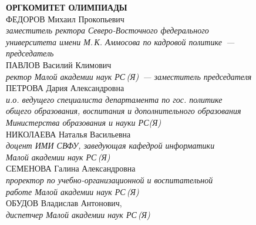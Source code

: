 \newpage
\noindent
\textbf{ОРГКОМИТЕТ ОЛИМПИАДЫ}
\\[2mm]
ФЕДОРОВ Михаил Прокопьевич \\ 
\textit{заместитель ректора Северо-Восточного федерального \\
университета имени М.\,К. Аммосова по кадровой политике~--- \\
председатель}
\\[2mm]
ПАВЛОВ Василий Климович \\
\textit{ректор Малой академии наук РС\,(Я)~--- 
заместитель председателя}
\\[2mm]
ПЕТРОВА Дария Александровна \\
\textit{и.о. ведущего специалиста департамента по гос. политике\\
общего образования, воспитания и дополнительного образования\\
Министерства образования и науки РС(Я)}
\\[2mm]
НИКОЛАЕВА Наталья Васильевна \\
\textit
{доцент ИМИ СВФУ, заведующая кафедрой информатики \\
Малой академии наук РС\,(Я)}
\\[2mm]
СЕМЕНОВА Галина Александровна \\
\textit
{проректор по учебно-организационной и воспитательной\\ 
работе Малой академии наук РС\,(Я)} 
\\[2mm]
ОБУДОВ Владислав Антонович,  \\
\textit{диспетчер  Малой академии наук РС\,(Я)}
\\[2mm]

\newpage

